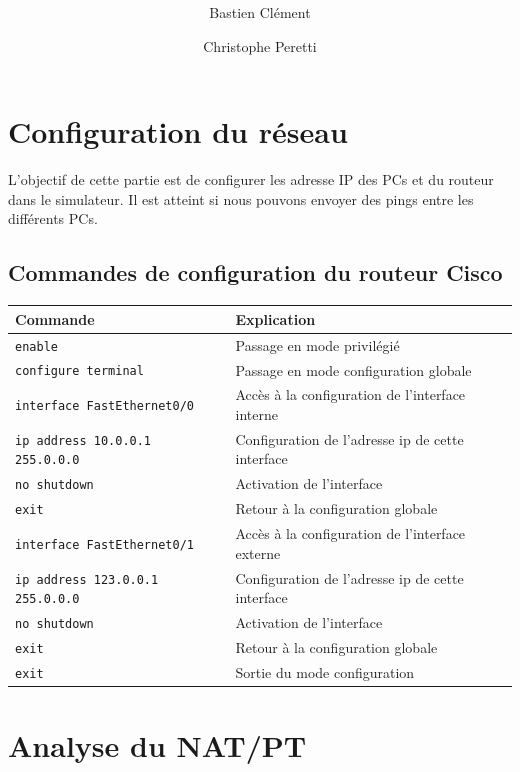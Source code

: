 \documentclass[11pt,a4paper]{article}
\author{Bastien Clément \and Christophe Peretti}
\title{{\normalsize \doccourse} \\ \doctitle }
\begin{document}
\maketitle
\vspace{1em}

\section{Configuration du réseau}

L'objectif de cette partie est de configurer les adresse IP des PCs et du routeur dans le simulateur. Il est atteint si nous pouvons envoyer des pings entre les différents PCs.

\subsection{Commandes de configuration du routeur Cisco}

\begin{tabular}{|l|l|}
	\hline	
	\textbf{Commande} & \textbf{Explication}  \\
	\hline
	\texttt{enable} & Passage en mode privilégié\\
	\texttt{configure terminal} & Passage en mode configuration globale\\
	\hline
	\texttt{interface FastEthernet0/0} & Accès à la configuration de l'interface interne\\
	\texttt{ip address 10.0.0.1 255.0.0.0} & Configuration de l'adresse ip de cette interface\\
	\texttt{no shutdown} & Activation de l'interface \\
	\texttt{exit} & Retour à la configuration globale \\
	\hline
	\texttt{interface FastEthernet0/1} & Accès à la configuration de l'interface externe \\
	\texttt{ip address 123.0.0.1 255.0.0.0} & Configuration de l'adresse ip de cette interface \\
	\texttt{no shutdown} & Activation de l'interface \\
	\texttt{exit} & Retour à la configuration globale \\
	\hline
	\texttt{exit} & Sortie du mode configuration \\
	\hline
\end{tabular}

\vspace{2.2cm}

\section{Analyse du NAT/PT}
\end{document}
